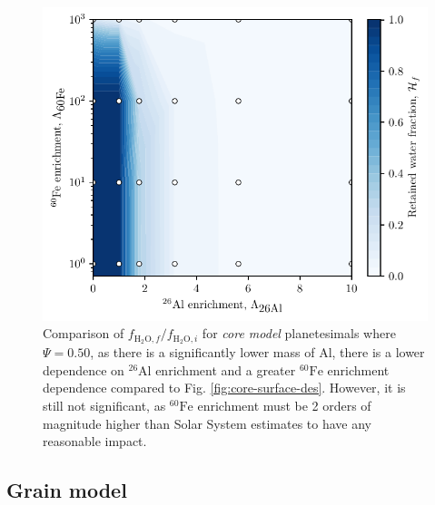 \documentclass[fleqn,usenatbib]{mnras}
\newcommand{\atom}[2]{$^{#2}\text{#1}$}
\newcommand{\al}{\atom{Al}{26}}
\newcommand{\fe}{\atom{Fe}{60}}
\newcommand{\waterfraci}{f_{\text{H}_2\text{O},i}}
\newcommand{\waterfracf}{f_{\text{H}_2\text{O},f}}
\newcommand{\waterfracfinal}{\waterfracf/\waterfraci}
\begin{document}
\begin{figure}
  \centering
  \includegraphics[scale=0.70]{assets/core-model-mix/0.50/des.pdf}
  \caption{Comparison of $\waterfracfinal$ for \emph{core model} planetesimals where $\Psi = 0.50$, as there is a significantly lower mass of Al, there is a lower dependence on \al{} enrichment and a greater \fe{} enrichment dependence compared to Fig. \ref{fig:core-surface-des}. However, it is still not significant, as \fe{} enrichment must be 2 orders of magnitude higher than Solar System estimates to have any reasonable impact.}
  \label{fig:core-0.5-des}
\end{figure}

\subsection{Grain model}
\label{sec:grainmodelresults}
\end{document}
